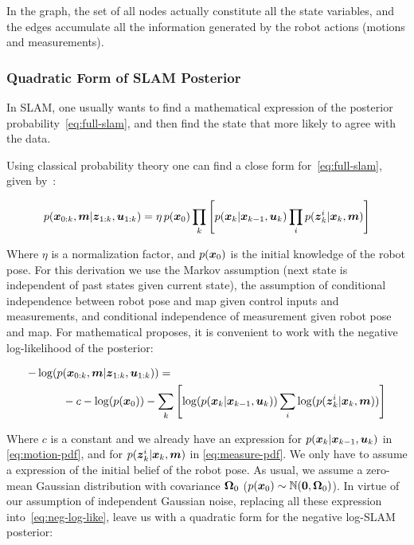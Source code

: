 In the graph, the set of all nodes actually constitute all the state variables, and the edges accumulate all the information generated by the robot actions (motions and measurements).

\subsubsection{Quadratic Form of SLAM Posterior}

In SLAM, one usually wants to find a mathematical expression of the posterior probability~\eqref{eq:full-slam}, and then find the state that more likely to agree with the data.

Using classical probability theory one can find a close form for~\eqref{eq:full-slam}, given by~\cite{graphslam}: %

\begin{equation}
p(\boldsymbol{x}_{0:k},\boldsymbol{m}|\boldsymbol{z}_{1:k},\boldsymbol{u}_{1:k}) = 
\eta\, p(\boldsymbol{x}_0) \prod_{k}\left[ p(\boldsymbol{x}_k|\boldsymbol{x}_{k-1},\boldsymbol{u}_k)\prod_{i}p(\boldsymbol{z}_k^i|\boldsymbol{x}_k,\boldsymbol{m})\right] 
\label{eq:posterior}
\end{equation} 

\noindent
Where $\eta$ is a normalization factor, and $p(\boldsymbol{x}_0)$ is the initial knowledge of the robot pose. For this derivation we use the Markov assumption (next state is independent of past states given current state), the assumption of conditional independence between robot pose and map given control inputs and measurements, and conditional independence of measurement given robot pose and map. For mathematical proposes, it is convenient to work with the negative log-likelihood of the posterior:

\begin{equation}
\begin{split}
-\log(p&(\boldsymbol{x}_{0:k},\boldsymbol{m}|\boldsymbol{z}_{1:k},\boldsymbol{u}_{1:k})) =\\ 
&-c - \log(p(\boldsymbol{x}_0)) - \sum_{k}\left[ \log(p(\boldsymbol{x}_k|\boldsymbol{x}_{k-1},\boldsymbol{u}_k))\sum_{i}\log(p(\boldsymbol{z}_k^i|\boldsymbol{x}_k,\boldsymbol{m}))\right] 
\end{split}
\label{eq:neg-log-like}
\end{equation}

Where $c$ is a constant and we already have an expression for $p(\boldsymbol{x}_k|\boldsymbol{x}_{k-1},\boldsymbol{u}_k)$ in \eqref{eq:motion-pdf}, and for $p(\boldsymbol{z}_k^i|\boldsymbol{x}_k,\boldsymbol{m})$ in \eqref{eq:measure-pdf}. We only have to assume a expression of the initial belief of the robot pose. As usual, we assume a zero-mean Gaussian distribution with covariance $\boldsymbol{\Omega}_0$ ($p(\boldsymbol{x}_0)\sim\mathbb{N}(\boldsymbol{0},\boldsymbol{\Omega}_0)$). In virtue of our assumption of independent Gaussian noise, replacing all these expression into~\eqref{eq:neg-log-like}, leave us with a quadratic form for the negative log-SLAM posterior:

